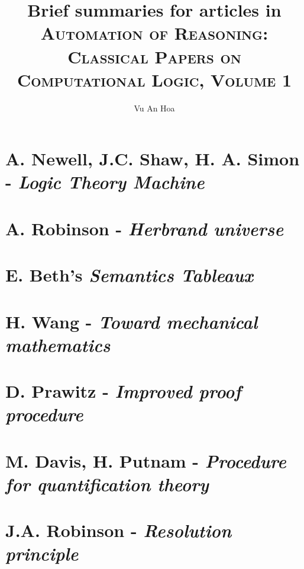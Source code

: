 \documentclass{article}
\begin{document}
\title{Brief summaries for articles in \textsc{Automation of Reasoning: Classical Papers on Computational Logic, Volume 1}}
\author{Vu An Hoa}
\maketitle

\section{A. Newell, J.C. Shaw, H. A. Simon - \emph{Logic Theory Machine}}

\section{A. Robinson - \emph{Herbrand universe}}

\section{E. Beth's \emph{Semantics Tableaux}}

\section{H. Wang - \emph{Toward mechanical mathematics}}

\section{D. Prawitz - \emph{Improved proof procedure}}

\section{M. Davis, H. Putnam - \emph{Procedure for quantification theory}}

\section{J.A. Robinson -  \emph{Resolution principle}}
\end{document}
